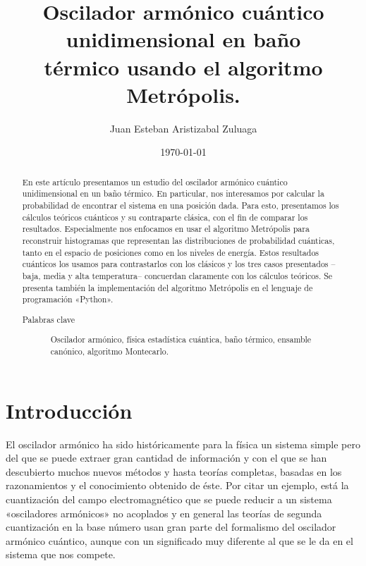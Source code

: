 \documentclass[%
 reprint,
 amsmath,amssymb,
 aps,
 pra,
]{revtex4-2}
\begin{document}

\title{Oscilador armónico cuántico unidimensional en baño\texorpdfstring{\\}{ }térmico usando el algoritmo Metrópolis.}%

\author{Juan Esteban Aristizabal Zuluaga}

\date{\today}%

\begin{abstract}
En este artículo presentamos un estudio del oscilador armónico cuántico unidimensional en un baño térmico. En particular, nos interesamos por calcular la probabilidad de encontrar el sistema en una posición dada. Para esto, presentamos los cálculos teóricos cuánticos y su contraparte clásica, con el fin de comparar los resultados. Especialmente nos enfocamos en usar el algoritmo Metrópolis para reconstruir histogramas que representan las distribuciones de probabilidad cuánticas, tanto en el espacio de posiciones como en los niveles de energía. Estos resultados cuánticos los usamos para contrastarlos con los clásicos y los tres casos presentados   –baja, media y alta temperatura– concuerdan claramente con los cálculos teóricos. Se presenta también la implementación del algoritmo Metrópolis en el lenguaje de programación «Python». 
\begin{description}
\item[Palabras clave] 	Oscilador armónico, física estadística cuántica, baño térmico, ensamble \\
						canónico, algoritmo Montecarlo.
\end{description}
\end{abstract}

\maketitle


\section{\label{sec:Intro}Introducción}
El oscilador armónico ha sido históricamente para la física un sistema simple pero del que se puede extraer gran cantidad de información y con el que se han descubierto muchos nuevos métodos y hasta teorías completas, basadas en los razonamientos y el conocimiento obtenido de éste. Por citar un ejemplo, está la cuantización del campo electromagnético que se puede reducir a un sistema «osciladores armónicos» no acoplados y en general las teorías de segunda cuantización en la base número usan gran parte del formalismo del oscilador armónico cuántico, aunque con un significado muy diferente al que se le da en el sistema que nos compete\cite{Grynberg2010,Schwartz2013}. 
\end{document}
